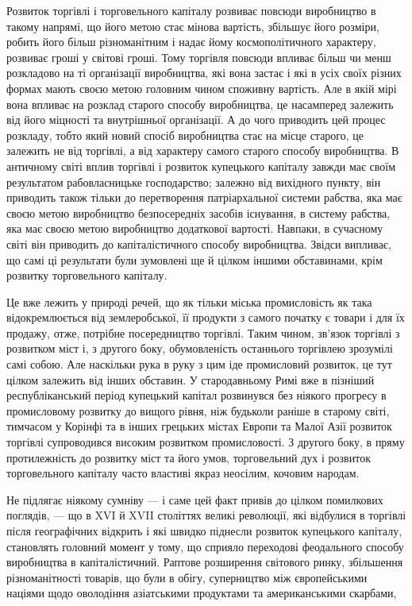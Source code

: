 
Розвиток торгівлі і торговельного капіталу розвиває повсюди
виробництво в такому напрямі, що його метою стає мінова вартість,
збільшує його розміри, робить його більш різноманітним і
надає йому космополітичного характеру, розвиває гроші у світові
гроші. Тому торгівля повсюди впливає більш чи менш розкладово
на ті організації виробництва, які вона застає і які в усіх
своїх різних формах мають своєю метою головним чином споживну
вартість. Але в якій мірі вона впливає на розклад старого
способу виробництва, це насамперед залежить від його
міцності та внутрішньої організації. А до чого приводить цей
процес розкладу, тобто який новий спосіб виробництва стає на
місце старого, це залежить не від торгівлі, а від характеру
самого старого способу виробництва. В античному світі вплив
торгівлі і розвиток купецького капіталу завжди має своїм результатом
рабовласницьке господарство; залежно від вихідного
пункту, він приводить також тільки до перетворення патріархальної
системи рабства, яка має своєю метою виробництво безпосередніх
засобів існування, в систему рабства, яка має своєю
метою виробництво додаткової вартості. Навпаки, в сучасному
світі він приводить до капіталістичного способу виробництва.
Звідси випливає, що самі ці результати були зумовлені ще
й цілком іншими обставинами, крім розвитку торговельного капіталу.

Це вже лежить у природі речей, що як тільки міська промисловість
як така відокремлюється від землеробської, її продукти
з самого початку є товари і для їх продажу, отже, потрібне
посередництво торгівлі. Таким чином, зв’язок торгівлі
з розвитком міст і, з другого боку, обумовленість останнього
торгівлею зрозумілі самі собою. Але наскільки рука в руку
з цим іде промисловий розвиток, це тут цілком залежить від
інших обставин. У стародавньому Римі вже в пізніший республіканський
період купецький капітал розвинувся без ніякого
прогресу в промисловому розвитку до вищого рівня, ніж будьколи
раніше в старому світі, тимчасом у Корінфі та в інших
грецьких містах Европи та Малої Азії розвиток торгівлі супроводився
високим розвитком промисловості. З другого боку,
в пряму протилежність до розвитку міст та його умов, торговельний
дух і розвиток торговельного капіталу часто властиві
якраз неосілим, кочовим народам.

Не підлягає ніякому сумніву — і саме цей факт привів до
цілком помилкових поглядів, — що в XVI й XVII століттях великі
революції, які відбулися в торгівлі після географічних відкрить
і які швидко піднесли розвиток купецького капіталу,
становлять головний момент у тому, що сприяло переходові
феодального способу виробництва в капіталістичний. Раптове
розширення світового ринку, збільшення різноманітності товарів,
що були в обігу, суперництво між європейськими націями щодо
оволодіння азіатськими продуктами та американськими скарбами,
\parbreak{}  %
